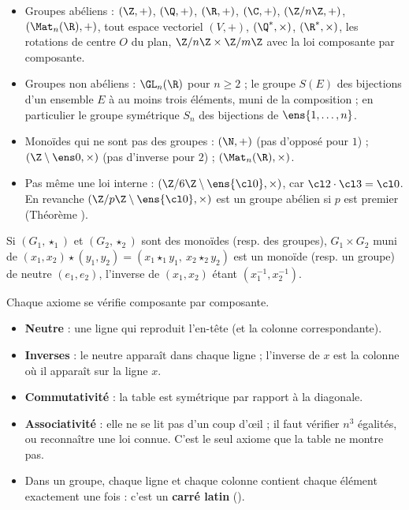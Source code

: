 \begin{exemple}
\begin{itemize}
\item Groupes abéliens : $(\Z,+)$, $(\Q,+)$, $(\R,+)$, $(\C,+)$, $(\Z/n\Z,+)$, $(\Mat_n(\R),+)$, tout espace vectoriel $(V,+)$, $(\Q^*,\times)$, $(\R^*,\times)$, les rotations de centre $O$ du plan, $\Z/n\Z\times\Z/m\Z$ avec la loi composante par composante.
\item Groupes non abéliens : $\GL_n(\R)$ pour $n\ge2$ ; le groupe $S(E)$ des bijections d'un ensemble $E$ à au moins trois éléments, muni de la composition ; en particulier le groupe symétrique $S_n$ des bijections de $\ens{1,\dots,n}$.
\item Monoïdes qui ne sont pas des groupes : $(\N,+)$ (pas d'opposé pour $1$) ; $(\Z\setminus\ens0,\times)$ (pas d'inverse pour $2$) ; $(\Mat_n(\R),\times)$.
\item Pas même une loi interne : $(\Z/6\Z\setminus\ens{\cl0},\times)$, car $\cl2\cdot\cl3=\cl0$. En revanche $(\Z/p\Z\setminus\ens{\cl0},\times)$ est un groupe abélien si $p$ est premier (Théorème ).
\end{itemize}
\end{exemple}
\begin{proposition}[Produit]
Si $(G_1,\star_1)$ et $(G_2,\star_2)$ sont des monoïdes (resp. des groupes), $G_1\times G_2$ muni de $(x_1,x_2)\star(y_1,y_2)=(x_1\star_1y_1,\ x_2\star_2y_2)$ est un monoïde (resp. un groupe) de neutre $(e_1,e_2)$, l'inverse de $(x_1,x_2)$ étant $(x_1^{-1},x_2^{-1})$.
\end{proposition}
\begin{preuve}
Chaque axiome se vérifie composante par composante.
\end{preuve}
\begin{methode}
\begin{itemize}
\item \textbf{Neutre} : une ligne qui reproduit l'en-tête (et la colonne correspondante).
\item \textbf{Inverses} : le neutre apparaît dans chaque ligne ; l'inverse de $x$ est la colonne où il apparaît sur la ligne $x$.
\item \textbf{Commutativité} : la table est symétrique par rapport à la diagonale.
\item \textbf{Associativité} : elle ne se lit pas d'un coup d'œil ; il faut vérifier $n^3$ égalités, ou reconnaître une loi connue. C'est le seul axiome que la table ne montre pas.
\item Dans un groupe, chaque ligne et chaque colonne contient chaque élément exactement une fois : c'est un \textbf{carré latin} ().
\end{itemize}
\end{methode}

